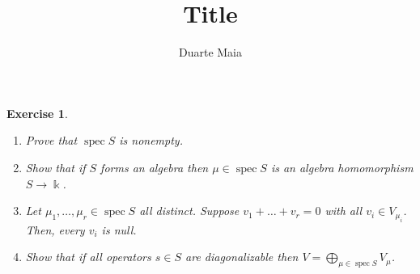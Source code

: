 \documentclass{article}
\title{Title}
\author{Duarte Maia}
\newtheorem{ex}{Exercise}
\theoremstyle{nonumberplain}
\newcommand{\kk}{\Bbbk}
\DeclareMathOperator{\spec}{spec}
\begin{document}
\maketitle

\begin{ex}\leavevmode
\begin{enumerate}
\item Prove that $\spec S$ is nonempty.
\item Show that if $S$ forms an algebra then $\mu \in \spec S$ is an algebra homomorphism $S \to \kk$.
\item Let $\mu_1, \dots, \mu_r \in \spec S$ all distinct. Suppose $v_1 + \dots + v_r = 0$ with all $v_i \in V_{\mu_i}$. Then, every $v_i$ is null.
\item Show that if all operators $s \in S$ are diagonalizable then $V = \bigoplus_{\mu \in \spec S} V_\mu$.
\end{enumerate}
\end{ex}
\end{document}
